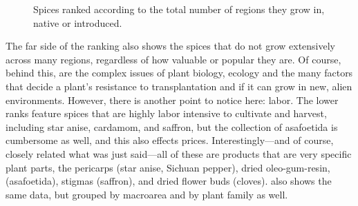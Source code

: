 \begin{figure}[!t]



	\caption{Spices ranked according to the total number of regions they grow in, native or introduced.}
	\label{fig:total_regions}
\end{figure}



The far side of the ranking also shows the spices that do not grow extensively across many regions, regardless of how valuable or popular they are. Of course, behind this, are the complex issues of plant biology, ecology and the many factors that decide a plant's resistance to transplantation and if it can grow in new, alien environments. However, there is another point to notice here: labor. The lower ranks feature spices that are highly labor intensive to cultivate and harvest, including star anise, cardamom, and saffron, but the collection of asafoetida is cumbersome as well, and this also effects prices. Interestingly---and of course, closely related what was just said---all of these are products that are very specific plant parts, the pericarps (star anise, Sichuan pepper), dried oleo-gum-resin, (asafoetida), stigmas (saffron), and dried flower buds (cloves).  also shows the same data, but grouped by macroarea and by plant family as well.



